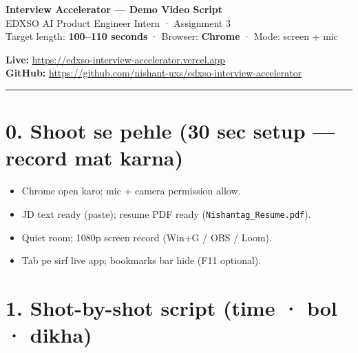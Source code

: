 \documentclass[11pt,a4paper]{article}
\begin{document}
\begin{center}
  {\LARGE\bfseries Interview Accelerator --- Demo Video Script}\\[0.35em]
  {\large EDXSO AI Product Engineer Intern · Assignment 3}\\[0.6em]
  {\normalsize Target length: \textbf{100--110 seconds} · Browser: \textbf{Chrome} · Mode: screen + mic}
\end{center}

\vspace{0.4em}
\noindent
\textbf{Live:} \url{https://edxso-interview-accelerator.vercel.app}\\
\textbf{GitHub:} \url{https://github.com/nishant-uxs/edxso-interview-accelerator}

\vspace{0.3em}
\hrule
\vspace{0.6em}

\section*{0. Shoot se pehle (30 sec setup --- record mat karna)}
\begin{itemize}[leftmargin=1.2em,itemsep=0.2em]
  \item Chrome open karo; mic + camera permission allow.
  \item JD text ready (paste); resume PDF ready (\texttt{Nishantag\_Resume.pdf}).
  \item Quiet room; 1080p screen record (Win+G / OBS / Loom).
  \item Tab pe sirf live app; bookmarks bar hide (F11 optional).
\end{itemize}

\section*{1. Shot-by-shot script (time · bol · dikha)}
\end{document}
